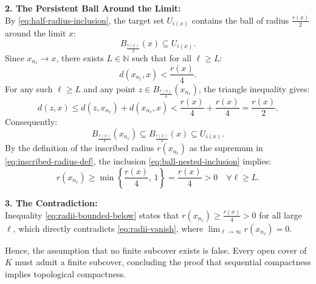 \begin{proofWrapper}
\begin{content}
\textbf{2. The Persistent Ball Around the Limit:} \\
By \eqref{eq:half-radius-inclusion}, the target set $U_{i(x)}$ contains the ball of radius $\frac{r(x)}{2}$ around the limit $x$:
\begin{equation}\label{eq:limit-ball-inclusion}
B_{\frac{r(x)}{2}}(x) \subseteq U_{i(x)}.
\end{equation}
Since $x_{n_\ell} \to x$, there exists $L \in \mathbb{N}$ such that for all $\ell \ge L$:
\begin{equation}\label{eq:subsequence-close-to-limit}
d(x_{n_\ell}, x) < \frac{r(x)}{4}.
\end{equation}
For any such $\ell \ge L$ and any point $z \in B_{\frac{r(x)}{4}}(x_{n_\ell})$, the triangle inequality gives:
\[
d(z, x) \le d(z, x_{n_\ell}) + d(x_{n_\ell}, x) < \frac{r(x)}{4} + \frac{r(x)}{4} = \frac{r(x)}{2}.
\]
Consequently:
\begin{equation}\label{eq:ball-nested-inclusion}
B_{\frac{r(x)}{4}}(x_{n_\ell}) \subseteq B_{\frac{r(x)}{2}}(x) \subseteq U_{i(x)}.
\end{equation}
By the definition of the inscribed radius $r(x_{n_\ell})$ as the supremum in \eqref{eq:inscribed-radius-def}, the inclusion \eqref{eq:ball-nested-inclusion} implies:
\begin{equation}\label{eq:radii-bounded-below}
r(x_{n_\ell}) \ge \min\left\{ \frac{r(x)}{4}, \, 1 \right\} = \frac{r(x)}{4} > 0 \quad \forall \ell \ge L.
\end{equation}

\textbf{3. The Contradiction:} \\
Inequality \eqref{eq:radii-bounded-below} states that $r(x_{n_\ell}) \ge \frac{r(x)}{4} > 0$ for all large $\ell$, which directly contradicts \eqref{eq:radii-vanish}, where $\lim_{\ell \to \infty} r(x_{n_\ell}) = 0$.

Hence, the assumption that no finite subcover exists is false. Every open cover of $K$ must admit a finite subcover, concluding the proof that sequential compactness implies topological compactness.
\end{content}


\end{proofWrapper}

